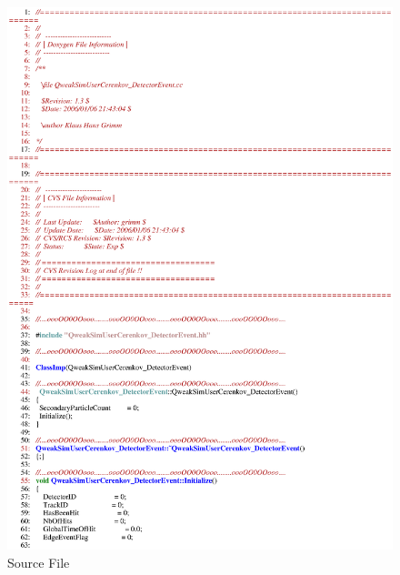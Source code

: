 \clearpage

\begin{figure}[ht]
  \hspace{0cm}
  \includegraphics[scale=0.8]{./figures5/QweakSimUserCerenkov_DetectorEvent.cc-p1.eps}
  \caption{\label{SourceV36} Source File}
           \label{fig:V-SC-39}
\end{figure}

\clearpage


